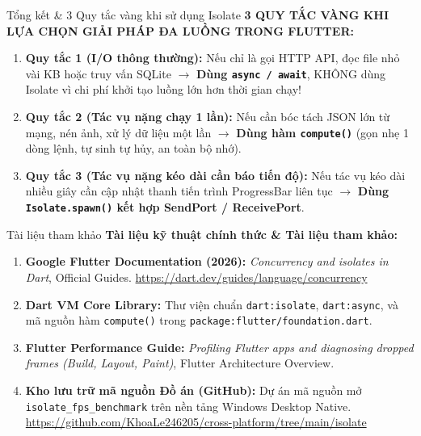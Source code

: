 \documentclass[aspectratio=169, 10pt]{beamer}
\begin{document}
\begin{frame}{Tổng kết \& 3 Quy tắc vàng khi sử dụng Isolate}
  \textbf{3 QUY TẮC VÀNG KHI LỰA CHỌN GIẢI PHÁP ĐA LUỒNG TRONG FLUTTER:}
  \vspace{0.2cm}
  \begin{enumerate}
    \item \textbf{Quy tắc 1 (I/O thông thường):}
    \newline Nếu chỉ là gọi HTTP API, đọc file nhỏ vài KB hoặc truy vấn SQLite $\rightarrow$ \textbf{Dùng \texttt{async / await}}, KHÔNG dùng Isolate vì chi phí khởi tạo luồng lớn hơn thời gian chạy!
    \vspace{0.15cm}
    \item \textbf{Quy tắc 2 (Tác vụ nặng chạy 1 lần):}
    \newline Nếu cần bóc tách JSON lớn từ mạng, nén ảnh, xử lý dữ liệu một lần $\rightarrow$ \textbf{Dùng hàm \texttt{compute()}} (gọn nhẹ 1 dòng lệnh, tự sinh tự hủy, an toàn bộ nhớ).
    \vspace{0.15cm}
    \item \textbf{Quy tắc 3 (Tác vụ nặng kéo dài cần báo tiến độ):}
    \newline Nếu tác vụ kéo dài nhiều giây cần cập nhật thanh tiến trình ProgressBar liên tục $\rightarrow$ \textbf{Dùng \texttt{Isolate.spawn()} kết hợp SendPort / ReceivePort}.
  \end{enumerate}
\end{frame}

\begin{frame}{Tài liệu tham khảo}
  \textbf{Tài liệu kỹ thuật chính thức \& Tài liệu tham khảo:}
  \vspace{0.3cm}
  \begin{enumerate}
    \item \textbf{Google Flutter Documentation (2026):} \textit{Concurrency and isolates in Dart}, Official Guides. \url{https://dart.dev/guides/language/concurrency}
    \vspace{0.15cm}
    \item \textbf{Dart VM Core Library:} Thư viện chuẩn \texttt{dart:isolate}, \texttt{dart:async}, và mã nguồn hàm \texttt{compute()} trong \texttt{package:flutter/foundation.dart}.
    \vspace{0.15cm}
    \item \textbf{Flutter Performance Guide:} \textit{Profiling Flutter apps and diagnosing dropped frames (Build, Layout, Paint)}, Flutter Architecture Overview.
    \vspace{0.15cm}
    \item \textbf{Kho lưu trữ mã nguồn Đồ án (GitHub):} Dự án mã nguồn mở \texttt{isolate\_fps\_benchmark} trên nền tảng Windows Desktop Native.\\
    \url{https://github.com/KhoaLe246205/cross-platform/tree/main/isolate}
  \end{enumerate}
\end{frame}
\end{document}
